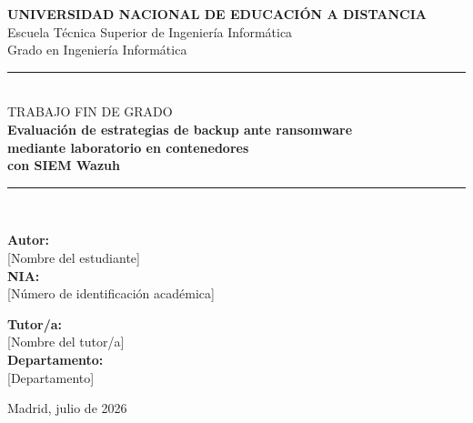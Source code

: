 \begin{titlepage}
  \centering
  \vspace*{1.5cm}

  {\large\textbf{UNIVERSIDAD NACIONAL DE EDUCACIÓN A DISTANCIA}}\\[0.4cm]
  {\large Escuela Técnica Superior de Ingeniería Informática}\\[0.3cm]
  {\large Grado en Ingeniería Informática}\\[2cm]

  \rule{\linewidth}{0.5pt}\\[0.6cm]
  {\small TRABAJO FIN DE GRADO}\\[0.4cm]
  {\LARGE\bfseries\color{uned-azul}
    Evaluación de estrategias de backup ante ransomware\\[0.3cm]
    mediante laboratorio en contenedores\\[0.3cm]
    con SIEM Wazuh
  }\\[0.6cm]
  \rule{\linewidth}{0.5pt}\\[2.5cm]

  \begin{minipage}[t]{0.45\textwidth}
    \raggedright
    \textbf{Autor:}\\
    {[Nombre del estudiante]}\\[0.3cm]
    \textbf{NIA:}\\
    {[Número de identificación académica]}
  \end{minipage}
  \hfill
  \begin{minipage}[t]{0.45\textwidth}
    \raggedleft
    \textbf{Tutor/a:}\\
    {[Nombre del tutor/a]}\\[0.3cm]
    \textbf{Departamento:}\\
    {[Departamento]}
  \end{minipage}

  \vfill

  {\large Madrid, julio de 2026}
\end{titlepage}
